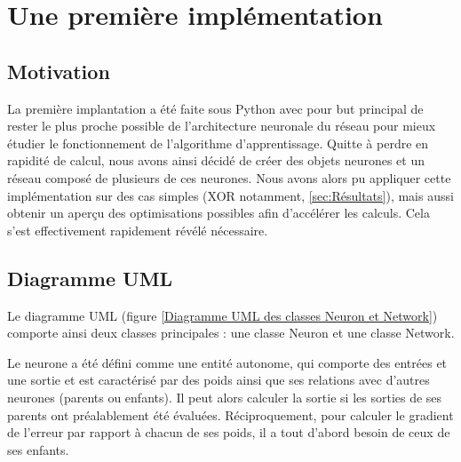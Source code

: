 \chapter{Une première implémentation}

\section{Motivation}

La première implantation a été faite sous Python avec pour but principal de rester le plus proche possible de l'architecture neuronale du réseau pour mieux étudier le fonctionnement de l'algorithme d'apprentissage. Quitte à perdre en rapidité de calcul, nous avons ainsi décidé de créer des objets neurones et un réseau composé de plusieurs de ces neurones. Nous avons alors pu appliquer cette implémentation sur des cas simples (XOR notamment, \autoref{sec:Résultats}), mais aussi obtenir un aperçu des optimisations possibles afin d'accélérer les calculs. Cela s'est effectivement rapidement révélé nécessaire.  

\section{Diagramme UML}

Le diagramme UML (figure \ref{Diagramme UML des classes Neuron et Network}) comporte ainsi deux classes principales : une classe Neuron et une classe Network. 

Le neurone a été défini comme une entité autonome, qui comporte des entrées et une sortie et est caractérisé par des poids ainsi que ses relations avec d'autres neurones (parents ou enfants). Il peut alors calculer la sortie si les sorties de ses parents ont préalablement été évaluées. Réciproquement, pour calculer le gradient de l'erreur par rapport à chacun de ses poids, il a tout d'abord besoin de ceux de ses enfants.


